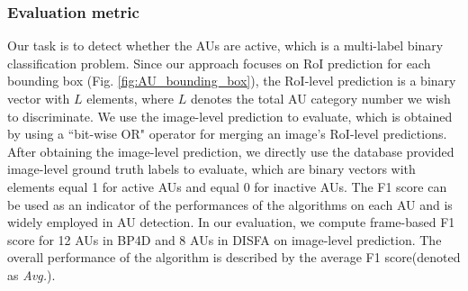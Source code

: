 \documentclass[5p,twocolumn]{elsarticle}
\begin{document}
\subsubsection{Evaluation metric}
Our task is to detect whether the AUs
are active, which is a multi-label binary classification problem. Since our approach focuses on RoI prediction for each bounding box (Fig. \ref{fig:AU_bounding_box}), the RoI-level prediction is a binary vector with $L$ elements, where $L$ denotes the total AU category number we wish to discriminate.  We use the image-level prediction to evaluate, which is obtained by using a ``bit-wise OR" operator for merging an image's RoI-level predictions. After obtaining the image-level prediction, we directly use the database provided image-level ground truth labels to evaluate, which are binary vectors with elements equal 1 for active AUs and equal 0 for inactive AUs. 
The F1 score can be used as an indicator of the performances of the algorithms on each AU and is widely employed in AU detection. In our evaluation, we compute frame-based F1 score \cite{ding2013facial} for 12 AUs in BP4D and 8 AUs in DISFA on image-level prediction. The overall performance of the algorithm is described by the average F1 score(denoted as \textit{Avg.}).
\end{document}
